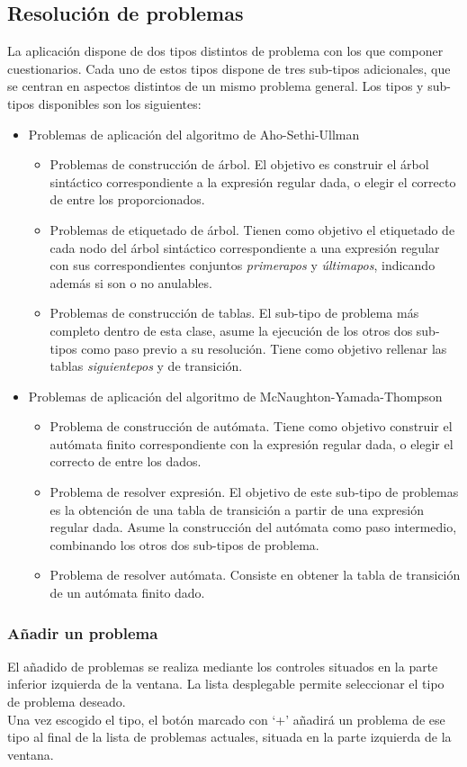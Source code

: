 \subsection{Resolución de problemas}
La aplicación dispone de dos tipos distintos de problema con los que componer cuestionarios.
Cada uno de estos tipos dispone de tres sub-tipos adicionales, que se centran en aspectos distintos de un mismo problema general.
Los tipos y sub-tipos disponibles son los siguientes:
\begin{itemize}
	\item Problemas de aplicación del algoritmo de Aho-Sethi-Ullman
	\begin{itemize}
		\item Problemas de construcción de árbol.
		El objetivo es construir el árbol sintáctico correspondiente a la expresión regular dada, o elegir el correcto de entre los proporcionados.
		\item Problemas de etiquetado de árbol.
		Tienen como objetivo el etiquetado de cada nodo del árbol sintáctico correspondiente a una expresión regular con sus correspondientes conjuntos \emph{primerapos} y \emph{últimapos}, indicando además si son o no anulables.
		\item Problemas de construcción de tablas.
		El sub-tipo de problema más completo dentro de esta clase, asume la ejecución de los otros dos sub-tipos como paso previo a su resolución.
		Tiene como objetivo rellenar las tablas \emph{siguientepos} y de transición.
	\end{itemize}
	\item Problemas de aplicación del algoritmo de McNaughton-Yamada-Thompson
	\begin{itemize}
		\item Problema de construcción de autómata.
		Tiene como objetivo construir el autómata finito correspondiente con la expresión regular dada, o elegir el correcto de entre los dados.
		\item Problema de resolver expresión.
		El objetivo de este sub-tipo de problemas es la obtención de una tabla de transición a partir de una expresión regular dada.
		Asume la construcción del autómata como paso intermedio, combinando los otros dos sub-tipos de problema.
		\item Problema de resolver autómata.
		Consiste en obtener la tabla de transición de un autómata finito dado.
	\end{itemize}
\end{itemize}

\subsubsection{Añadir un problema}
El añadido de problemas se realiza mediante los controles situados en la parte inferior izquierda de la ventana.
La lista desplegable permite seleccionar el tipo de problema deseado.
\\
Una vez escogido el tipo, el botón marcado con `+' añadirá un problema de ese tipo al final de la lista de problemas actuales, situada en la parte izquierda de la ventana.

